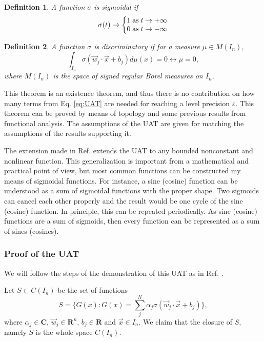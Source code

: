 \documentclass[aps,amssymb,amsmath,amsfonts,pra,superscriptaddress,onecolumn]{revtex4}
\newtheorem{definition}{Definition}
\begin{document}
\begin{definition}
A function $\sigma$ is sigmoidal if
\begin{equation}
    \sigma(t) \rightarrow \left\lbrace \begin{matrix}
    1 \;{\rm as}\; t\rightarrow +\infty \\
    0 \;{\rm as}\; t\rightarrow -\infty 
    \end{matrix} \right.
\end{equation}
\end{definition}{}

\begin{definition}
A function $\sigma$ is discriminatory if for a measure $\mu \in M(I_n)$, 
\begin{equation}
    \int_{I_n} \sigma(\vec w_j \cdot \vec x + b_j) d\mu(x) = 0 \leftrightarrow \mu = 0, 
\end{equation}
where $M(I_n)$ is the space of signed regular Borel measures on $I_n$.
\end{definition}

This theorem is an existence theorem, and thus there is no contribution on how many terms from Eq. \eqref{eq:UAT} are needed for reaching a level precision $\varepsilon$. This theorem can be proved by means of topology and some previous results from functional analysis. The assumptions of the UAT are given for matching the assumptions of the results supporting it. 

The extension made in Ref. \cite{uat-hornik1991} extends the UAT to any bounded nonconstant and nonlinear function. This generalization is important from a mathematical and practical point of view, but most common functions can be constructed my means of sigmoidal functions. For instance, a sine (cosine) function can be understood as a sum of sigmoidal functions with the proper shape. Two sigmoids can cancel each other properly and the result would be one cycle of the sine (cosine) function. In principle, this can be repeated periodically. As sine (cosine) functions are a sum of sigmoids, then every function can be represented as a sum of sines (cosines).

\subsubsection{Proof of the UAT}
We will follow the steps of the demonstration of this UAT as in Ref. \cite{uat-cybenko1989}.

Let $S \subset C(I_n)$ be the set of functions 
\begin{equation}
S = \lbrace G(x) : G(x) = \sum_j^N \alpha_j \sigma (\vec w_j \cdot \vec x + b_j)\rbrace, 
\end{equation}
where $\alpha_j \in \mathbf{C}$, $\vec w_j \in \mathbf{R}^n$, $b_j \in \mathbf{R}$ and $\vec x \in I_n$. We claim that the closure of $S$, namely $\bar S$ is the whole space $C(I_n)$. 
\end{document}
